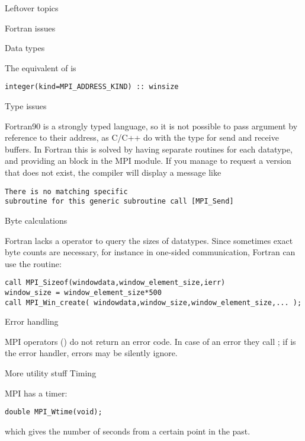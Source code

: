  {Leftover topics}

 {Fortran issues}

 {Data types}

The equivalent of  is
\begin{verbatim}
integer(kind=MPI_ADDRESS_KIND) :: winsize
\end{verbatim}

 {Type issues}

Fortran90 is a strongly typed language, so it is not possible to pass
argument by reference to their address, as C/C++ do with the 
type for send and receive buffers. In Fortran this is solved by having
separate routines for each datatype, and providing an  block
in the MPI module. If you manage to request a version that does not exist,
the compiler will display a message like
\begin{verbatim}
There is no matching specific 
subroutine for this generic subroutine call [MPI_Send]
\end{verbatim}

 {Byte calculations}
\label{sec:f-sizeof}

Fortran lacks a  operator to query the sizes of datatypes.
Since sometimes exact byte counts are necessary,
for instance in one-sided communication,
Fortran can use the  routine:
\begin{verbatim}
call MPI_Sizeof(windowdata,window_element_size,ierr)
window_size = window_element_size*500
call MPI_Win_create( windowdata,window_size,window_element_size,... );
\end{verbatim}


 {Error handling}

MPI operators () do not return an error code. In case of
an error they call ; if 
is the error handler, errors may be silently ignore.

 {More utility stuff}
 {Timing}

MPI has a  timer: 
\begin{verbatim}
double MPI_Wtime(void);
\end{verbatim}
which gives the number of seconds from a certain point in the past.

